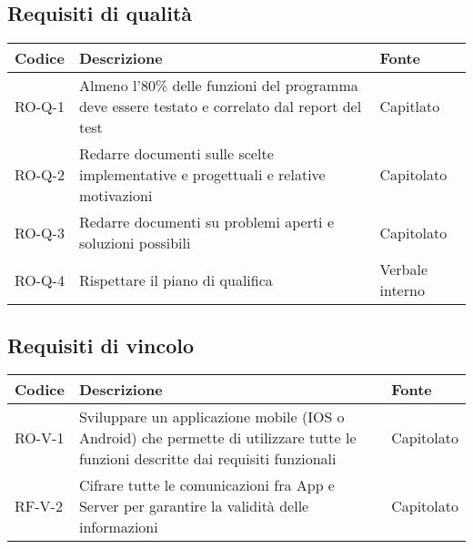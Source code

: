 \subsection{Requisiti di qualità}
\begin{center}
\renewcommand{\arraystretch}{1.8} %
\begin{tabular}{ | m{8em} | m{18em} | m{12em} | }
\hline
Codice&Descrizione&Fonte\\
\hline
RO-Q-1&Almeno l'80\% delle funzioni del programma deve essere testato e correlato dal report del test&Capitlato\\
\hline
RO-Q-2&Redarre documenti sulle scelte implementative e progettuali e relative motivazioni&Capitolato\\
\hline
RO-Q-3&Redarre documenti su problemi aperti e soluzioni possibili&Capitolato\\
\hline
RO-Q-4&Rispettare il piano di qualifica&Verbale interno\\
\hline
\end{tabular}
\end{center}

\subsection{Requisiti di vincolo}
\begin{center}
\renewcommand{\arraystretch}{1.8} %
\begin{tabular}{ | m{8em} | m{18em} | m{12em} | }
\hline
Codice&Descrizione&Fonte\\
\hline
RO-V-1&Sviluppare un applicazione mobile (IOS o Android) che permette di utilizzare tutte le funzioni descritte dai requisiti funzionali&Capitolato\\
\hline
RF-V-2&Cifrare tutte le comunicazioni fra App e Server per garantire la validità delle informazioni&Capitolato\\
\hline
\end{tabular}
\end{center}
